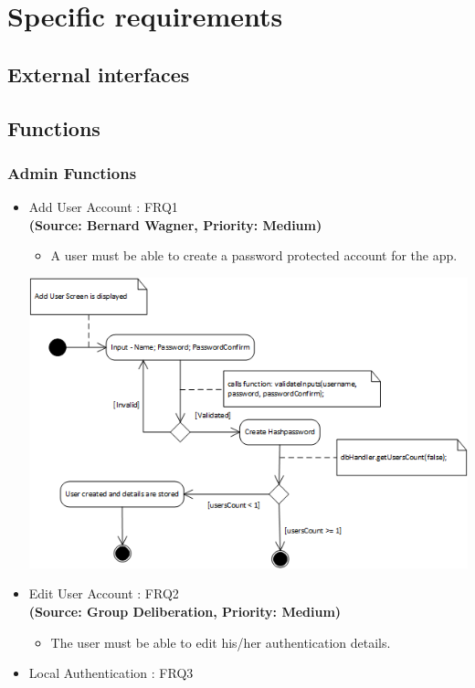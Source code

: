 \section{Specific requirements}

\subsection{External interfaces}

\subsection{Functions}
\subsubsection{Admin Functions}
\begin{itemize}
\item{Add User Account : FRQ1}\\
\textbf{(Source: Bernard Wagner, Priority: Medium)}
\begin{itemize}
\item A user must be able to create a password protected account for the app.
\end{itemize}
 \includegraphics[width=13cm]{diagrams/StateDiagrams/AddUserStateDiagram.png}
\item{Edit User Account : FRQ2}\\
\textbf{(Source: Group Deliberation, Priority: Medium)}
\begin{itemize}
\item The user must be able to edit his/her authentication details.
\end{itemize}
\item{Local Authentication : FRQ3}\\%

\end{itemize}
